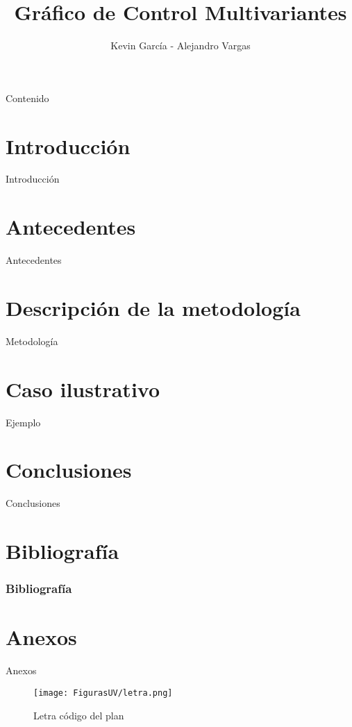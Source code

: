 \documentclass[10pt]{beamer}
\author{Kevin García - Alejandro Vargas}
\title{Gráfico de Control Multivariantes}
\begin{document}
\begin{frame}[plain]
\maketitle
\end{frame}

\begin{frame}{Contenido}
\tableofcontents
\end{frame}

\section{Introducción}
\begin{frame}{Introducción}

\end{frame}

\section{Antecedentes}
\begin{frame}{Antecedentes}

\end{frame}

\section{Descripción de la metodología}
\begin{frame}{Metodología}

\end{frame}

\section{Caso ilustrativo}
\begin{frame}{Ejemplo}

\end{frame}


\section{Conclusiones}
\begin{frame}{Conclusiones}

\end{frame}

\section{Bibliografía}
\begin{frame}
  \frametitle{Bibliografía}
  
\nocite{A0,ControlR}
  
  
  
\end{frame}

\section{Anexos}
\begin{frame}{Anexos}
\begin{figure}[h!]
  \centering
  \texttt{[image: FigurasUV/letra.png]}
  \caption{Letra código del plan}
\end{figure}
\end{frame}
\end{document}

